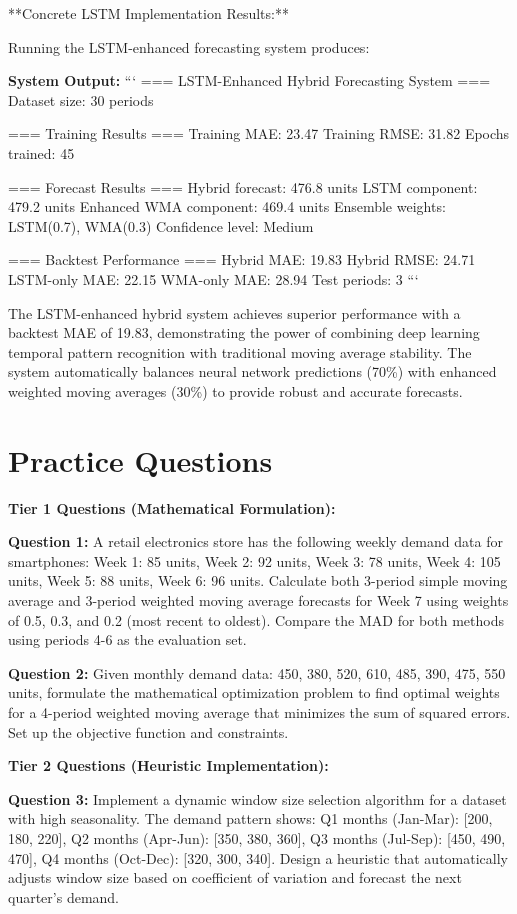 \documentclass{article}
\begin{document}
**Concrete LSTM Implementation Results:**

Running the LSTM-enhanced forecasting system produces:

\textbf{System Output:}
```
=== LSTM-Enhanced Hybrid Forecasting System ===
Dataset size: 30 periods

=== Training Results ===
Training MAE: 23.47
Training RMSE: 31.82
Epochs trained: 45

=== Forecast Results ===
Hybrid forecast: 476.8 units
LSTM component: 479.2 units
Enhanced WMA component: 469.4 units
Ensemble weights: LSTM(0.7), WMA(0.3)
Confidence level: Medium

=== Backtest Performance ===
Hybrid MAE: 19.83
Hybrid RMSE: 24.71
LSTM-only MAE: 22.15
WMA-only MAE: 28.94
Test periods: 3
```

The LSTM-enhanced hybrid system achieves superior performance with a backtest MAE of 19.83, demonstrating the power of combining deep learning temporal pattern recognition with traditional moving average stability. The system automatically balances neural network predictions (70\%) with enhanced weighted moving averages (30\%) to provide robust and accurate forecasts.

\section{Practice Questions}

\textbf{Tier 1 Questions (Mathematical Formulation):}

\textbf{Question 1:} A retail electronics store has the following weekly demand data for smartphones: Week 1: 85 units, Week 2: 92 units, Week 3: 78 units, Week 4: 105 units, Week 5: 88 units, Week 6: 96 units. Calculate both 3-period simple moving average and 3-period weighted moving average forecasts for Week 7 using weights of 0.5, 0.3, and 0.2 (most recent to oldest). Compare the MAD for both methods using periods 4-6 as the evaluation set.

\textbf{Question 2:} Given monthly demand data: 450, 380, 520, 610, 485, 390, 475, 550 units, formulate the mathematical optimization problem to find optimal weights for a 4-period weighted moving average that minimizes the sum of squared errors. Set up the objective function and constraints.

\textbf{Tier 2 Questions (Heuristic Implementation):}

\textbf{Question 3:} Implement a dynamic window size selection algorithm for a dataset with high seasonality. The demand pattern shows: Q1 months (Jan-Mar): [200, 180, 220], Q2 months (Apr-Jun): [350, 380, 360], Q3 months (Jul-Sep): [450, 490, 470], Q4 months (Oct-Dec): [320, 300, 340]. Design a heuristic that automatically adjusts window size based on coefficient of variation and forecast the next quarter's demand.
\end{document}
